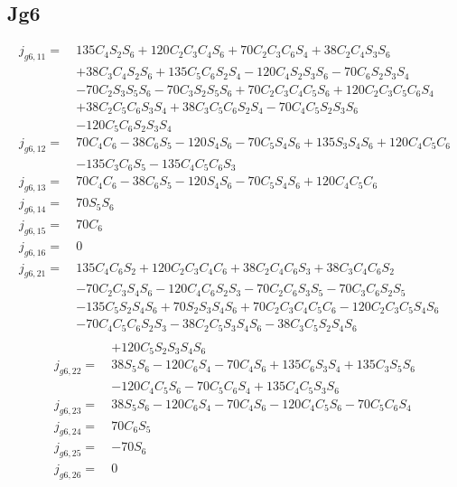 \subsection{ \textbf{Jg6} }
\begin{equation*}
\begin{split}
j_{g6,11} =\  &135C_4S_2S_6 + 120C_2C_3C_4S_6 + 70C_2C_3C_6S_4 + 38C_2C_4S_3S_6\\
		 	  & + 38C_3C_4S_2S_6+ 135C_5C_6S_2S_4 - 120C_4S_2S_3S_6 - 70C_6S_2S_3S_4\\
		 	  & - 70C_2S_3S_5S_6 - 70C_3S_2S_5S_6+ 70C_2C_3C_4C_5S_6 + 120C_2C_3C_5C_6S_4\\
		 	  & + 38C_2C_5C_6S_3S_4 + 38C_3C_5C_6S_2S_4- 70C_4C_5S_2S_3S_6\\
		 	  & - 120C_5C_6S_2S_3S_4\\
j_{g6,12} =\  &70C_4C_6 - 38C_6S_5 - 120S_4S_6 - 70C_5S_4S_6 + 135S_3S_4S_6 + 120C_4C_5C_6\\
		 	  & - 135C_3C_6S_5- 135C_4C_5C_6S_3\\   
j_{g6,13} =\  &70C_4C_6 - 38C_6S_5 - 120S_4S_6 - 70C_5S_4S_6 + 120C_4C_5C_6\\
j_{g6,14} =\  &70S_5S_6\\
j_{g6,15} =\  &70C_6\\
j_{g6,16} =\  &0\\
j_{g6,21} =\  &135C_4C_6S_2 + 120C_2C_3C_4C_6 + 38C_2C_4C_6S_3 + 38C_3C_4C_6S_2\\
		 	  & - 70C_2C_3S_4S_6 - 120C_4C_6S_2S_3 - 70C_2C_6S_3S_5 - 70C_3C_6S_2S_5\\
		 	  & - 135C_5S_2S_4S_6 + 70S_2S_3S_4S_6 + 70C_2C_3C_4C_5C_6 - 120C_2C_3C_5S_4S_6\\
		 	  & - 70C_4C_5C_6S_2S_3 - 38C_2C_5S_3S_4S_6 - 38C_3C_5S_2S_4S_6\\
\end{split}
\end{equation*}
\begin{equation*}
\begin{split}
		 	  & + 120C_5S_2S_3S_4S_6\\
j_{g6,22} =\  &38S_5S_6 - 120C_6S_4 - 70C_4S_6 + 135C_6S_3S_4 + 135C_3S_5S_6\\
		 	  & - 120C_4C_5S_6 - 70C_5C_6S_4 + 135C_4C_5S_3S_6\\
j_{g6,23} =\  &38S_5S_6 - 120C_6S_4 - 70C_4S_6 - 120C_4C_5S_6 - 70C_5C_6S_4\\
j_{g6,24} =\  &70C_6S_5\\
j_{g6,25} =\  &-70S_6\\
j_{g6,26} =\  &0\\
\end{split}
\end{equation*}